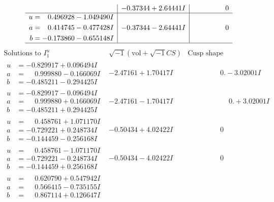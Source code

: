\documentclass[1p]{elsarticle_modified}
\theoremstyle{definition}
\newcommand{\I}{\sqrt{-1}}
\begin{document}
$$\begin{array}{c|c|c}
 & -0.37344 + 2.64441 I & \phantom{-0.000000 } 0 \\ \hline\begin{aligned}
u &= \phantom{-}0.496928 - 1.049490 I \\
a &= \phantom{-}0.414745 - 0.477428 I \\
b &= -0.173860 - 0.655148 I\end{aligned}
 & -0.37344 - 2.64441 I & \phantom{-0.000000 } 0\\
 \hline 
 \end{array}$$\newpage$$\begin{array}{c|c|c}  
\text{Solutions to }I^u_{1}& \I (\text{vol} + \sqrt{-1}CS) & \text{Cusp shape}\\
 \hline 
\begin{aligned}
u &= -0.829917 + 0.096494 I \\
a &= \phantom{-}0.999880 - 0.166069 I \\
b &= -0.485211 - 0.294425 I\end{aligned}
 & -2.47161 + 1.70417 I & \phantom{-0.000000 } 0. - 3.02001 I \\ \hline\begin{aligned}
u &= -0.829917 - 0.096494 I \\
a &= \phantom{-}0.999880 + 0.166069 I \\
b &= -0.485211 + 0.294425 I\end{aligned}
 & -2.47161 - 1.70417 I & \phantom{-0.000000 -}0. + 3.02001 I \\ \hline\begin{aligned}
u &= \phantom{-}0.458761 + 1.071170 I \\
a &= -0.729221 + 0.248734 I \\
b &= -0.144459 - 0.256168 I\end{aligned}
 & -0.50434 + 4.02422 I & \phantom{-0.000000 } 0 \\ \hline\begin{aligned}
u &= \phantom{-}0.458761 - 1.071170 I \\
a &= -0.729221 - 0.248734 I \\
b &= -0.144459 + 0.256168 I\end{aligned}
 & -0.50434 - 4.02422 I & \phantom{-0.000000 } 0 \\ \hline\begin{aligned}
u &= \phantom{-}0.620790 + 0.547942 I \\
a &= \phantom{-}0.566415 - 0.735155 I \\
b &= \phantom{-}0.867114 + 0.126647 I\end{aligned}

\end{array}$$
\end{document}
